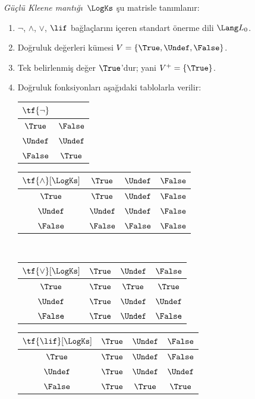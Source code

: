 \begin{defn}
\emph{Güçlü Kleene mantığı}~$\LogKs$ şu matrisle tanımlanır:
\begin{enumerate}
  \item $\lnot$, $\land$, $\lor$, $\lif$ bağlaçlarını içeren standart
  önerme dili $\Lang L_0$.
  \item Doğruluk değerleri kümesi $V = \{\True, \Undef, \False\}$.
  \item Tek belirlenmiş değer $\True$'dur; yani $V^+ = \{\True\}$.
  \item Doğruluk fonksiyonları aşağıdaki tablolarla verilir:
  \begin{center}
    \begin{tabular}{c|c} 
      $\tf{\lnot}$ & \\ 
      \hline  
      $\True$ & $\False$ \\ 
      $\Undef$ & $\Undef$ \\
      $\False$ & $\True$ 
    \end{tabular}
    \quad
    \begin{tabular}{c|ccc} 
      $\tf{\land}[\LogKs]$ & $\True$ & $\Undef$ & $\False$ \\ 
      \hline 
      $\True$ & $\True$ & $\Undef$ & $\False$ \\ 
      $\Undef$ & $\Undef$ & $\Undef$ & $\False$\\ 
      $\False$ & $\False$ & $\False$ & $\False$ 
    \end{tabular}
    \\[2ex]
    \begin{tabular}{c|ccc} 
      $\tf{\lor}[\LogKs]$ & $\True$ & $\Undef$ & $\False$ \\ 
      \hline 
      $\True$ & $\True$ & $\True$ & $\True$ \\ 
      $\Undef$ & $\True$ & $\Undef$ & $\Undef$ \\
      $\False$ & $\True$ & $\Undef$ & $\False$ 
    \end{tabular}
    \quad
    \begin{tabular}{c|ccc} 
      $\tf{\lif}[\LogKs]$ & $\True$ & $\Undef$ & $\False$ \\ 
      \hline 
      $\True$ & $\True$ & $\Undef$ & $\False$ \\ 
      $\Undef$ & $\True$ & $\Undef$ & $\Undef$  \\ 
      $\False$ & $\True$ & $\True$ & $\True$ 
    \end{tabular}
  \end{center} 
\end{enumerate}
\end{defn}

